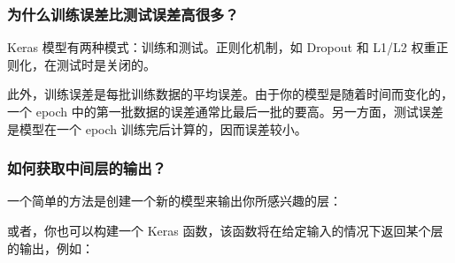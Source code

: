 \subsubsection{为什么训练误差比测试误差高很多？}\label{why-is-the-training-loss-much-higher-than-the-testing-loss}

Keras 模型有两种模式：训练和测试。正则化机制，如 Dropout 和 L1/L2
权重正则化，在测试时是关闭的。

此外，训练误差是每批训练数据的平均误差。由于你的模型是随着时间而变化的，一个
epoch
中的第一批数据的误差通常比最后一批的要高。另一方面，测试误差是模型在一个
epoch 训练完后计算的，因而误差较小。



\subsubsection{如何获取中间层的输出？}\label{how-can-i-obtain-the-output-of-an-intermediate-layer}

一个简单的方法是创建一个新的模型来输出你所感兴趣的层：

\begin{Shaded}
\begin{Highlighting}[]
  

\OperatorTok{=} 

\OperatorTok{=} 
\OperatorTok{=} \OperatorTok{=}\NormalTok{,}
                                 \OperatorTok{=}
\OperatorTok{=} 
\end{Highlighting}
\end{Shaded}

或者，你也可以构建一个 Keras
函数，该函数将在给定输入的情况下返回某个层的输出，例如：

\begin{Shaded}
\begin{Highlighting}[]
   

\OperatorTok{=} \NormalTok{K.function([model.layers[}\NormalTok{].}\NormalTok{],}
                                  \NormalTok{[model.layers[}\NormalTok{].output])}
\OperatorTok{=} \NormalTok{get_3rd_layer_output([x])[}\NormalTok{]}
\end{Highlighting}
\end{Shaded}

